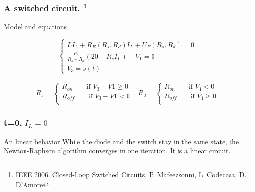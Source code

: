 
\frame
{

\frametitle{A switched circuit. \footnote{IEEE 2006. Closed-Loop Switched Circuits. P. Mafeezzonni, L. Codecasa, D. D'Amore}}
  \begin{figure}[!h]
   \centerline{
   \scalebox{0.9}{
    
    }
 } 
 \end{figure}



 
}

\frame
{

  \begin{figure}[!h]
   \centerline{
   \scalebox{0.9}{
    
    }
 } 
 \end{figure}
\begin{block}{Model and equations}

\[
\begin{cases}
L \dot I_L + R_E(R_s,R_d)I_L + U_E(R_s,R_d) =0 \\
\frac{R_d}{R_s+R_d} (20 - R_sI_L)-V_1=0\\
V_3=s(t)
\end{cases}
\]


\begin{equation}
\begin{array}{cc}
R_s= \begin{cases}
R_{on} \qquad \text{if $V_3-V1 \geq 0$}\\
R_{off} \qquad \text{if $V_3-V1 < 0$}\\
\end{cases}&
R_d= \begin{cases}
R_{on} \qquad \text{if $V_1 < 0$}\\
R_{off} \qquad \text{if $V_1 \geq 0$}\\
\end{cases}
\end{array}
\end{equation}

\end{block}

 }


 
 \frame
{

\frametitle{t=0, $I_L=0$}
  \begin{figure}[!h]
   \centerline{
   \scalebox{0.9}{
    
    }
 } 
 \end{figure}
 

 \begin{block}{An linear behavior}
While the diode and the switch stay in the same state, the Newton-Raphson algorithm converges in
one iteration. It is a linear circuit.

\end{block}
 }

